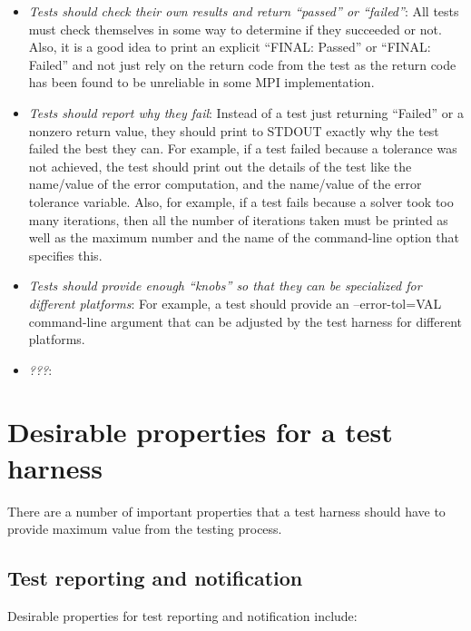 \documentclass[pdf,ps2pdf,11pt]{SANDreport}
\begin{document}
\begin{itemize}

{}\item\textit{Tests should check their own results and return
``passed'' or ``failed''}: All tests must check themselves in some way
to determine if they succeeded or not.  Also, it is a good idea to
print an explicit ``FINAL: Passed'' or ``FINAL: Failed'' and not just
rely on the return code from the test as the return code has been
found to be unreliable in some MPI implementation.

{}\item\textit{Tests should report why they fail}: Instead of a test
just returning ``Failed'' or a nonzero return value, they should print
to STDOUT exactly why the test failed the best they can.  For example,
if a test failed because a tolerance was not achieved, the test should
print out the details of the test like the name/value of the error
computation, and the name/value of the error tolerance variable.
Also, for example, if a test fails because a solver took too many
iterations, then all the number of iterations taken must be printed as
well as the maximum number and the name of the command-line option
that specifies this.

{}\item\textit{Tests should provide enough ``knobs'' so that they can
be specialized for different platforms}: For example, a test should
provide an --error-tol=VAL command-line argument that can be adjusted
by the test harness for different platforms.

{}\item\textit{???}:

\end{itemize}


%
{}\section{Desirable properties for a test harness}
%

There are a number of important properties that a test harness should
have to provide maximum value from the testing process.

%
\subsection{Test reporting and notification}
%

Desirable properties for test reporting and notification include:
\end{document}
